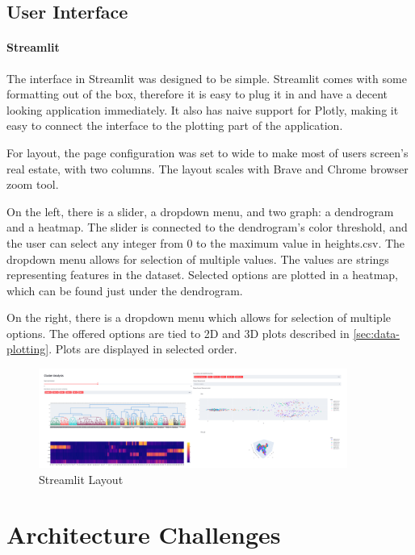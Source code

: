 \newpage
\subsection{User Interface}
\label{sec:userinter}
\paragraph{Streamlit}
\label{sec:st2}
The interface in Streamlit was designed to be simple. Streamlit comes with some formatting out of the box, therefore it is easy to plug it in and have a decent looking application immediately. It also has naive support for Plotly, making it easy to connect the interface to the plotting part of the application. 

For layout, the page configuration was set to wide to make most of users screen's real estate, with two columns. The layout scales with Brave and Chrome browser zoom tool.

On the left, there is a slider, a dropdown menu, and two graph: a dendrogram and a heatmap. The slider is connected to the dendrogram's color threshold, and the user can select any integer from 0 to the maximum value in heights.csv. The dropdown menu allows for selection of multiple values. The values are strings representing features in the dataset. Selected options are plotted in a heatmap, which can be found just under the dendrogram. 

On the right, there is a dropdown menu which allows for selection of multiple options. The offered options are tied to 2D and 3D plots described in \ref{sec:data-plotting}. Plots are displayed in selected order. 

    \begin{figure}[h!]
        \centering
        \includegraphics[width=0.9\textwidth]{Figures/streamlit_screen.png}
        \caption{Streamlit Layout}
        \label{fig:streamlay}
    \end{figure}


\newpage
\section{Architecture Challenges}
\label{sec:arch_chal}
